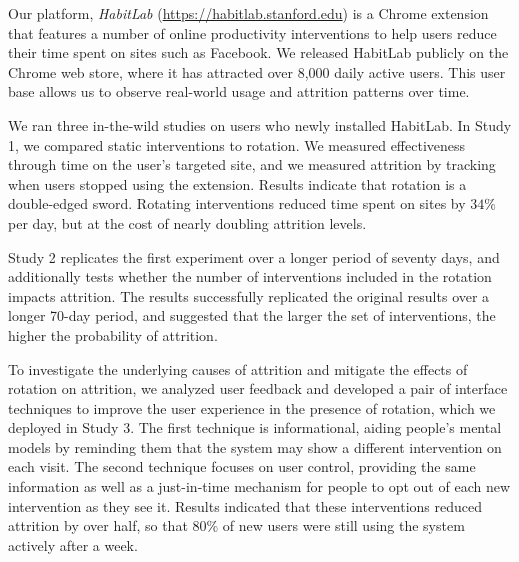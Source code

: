 Our platform, \textit{HabitLab} (\url{https://habitlab.stanford.edu}) is a Chrome extension that features a number of online productivity interventions to help users reduce their time spent on sites such as Facebook. We released HabitLab publicly on the Chrome web store, where it has attracted over 8,000 daily active users. This user base allows us to observe real-world usage and attrition patterns over time. %

We ran three in-the-wild studies on users who newly installed HabitLab. In Study 1, we compared static interventions to rotation. %
We measured effectiveness through time on the user's targeted site, and we measured attrition by tracking when users stopped using the extension.
Results indicate that rotation is a double-edged sword. %
Rotating interventions reduced time spent on sites by $34\%$ per day, but at the cost of nearly doubling attrition levels.  %

Study 2 replicates the first experiment over a longer period of seventy days, and additionally tests whether the number of interventions included in the rotation impacts attrition. The results successfully replicated the original results over a longer 70-day period, and suggested that the larger the set of interventions, the higher the probability of attrition.

To investigate the underlying causes of attrition and mitigate the effects of rotation on attrition, we analyzed user feedback and developed a pair of interface techniques to improve the user experience in the presence of rotation, which we deployed in Study 3. The first technique is informational, aiding people's mental models by reminding them that the system may show a different intervention on each visit. The second technique focuses on user control, providing the same information as well as a just-in-time mechanism for people to opt out of each new intervention as they see it. Results indicated that these interventions reduced attrition by over half, so that $80\%$ of new users were still using the system actively after a week.

